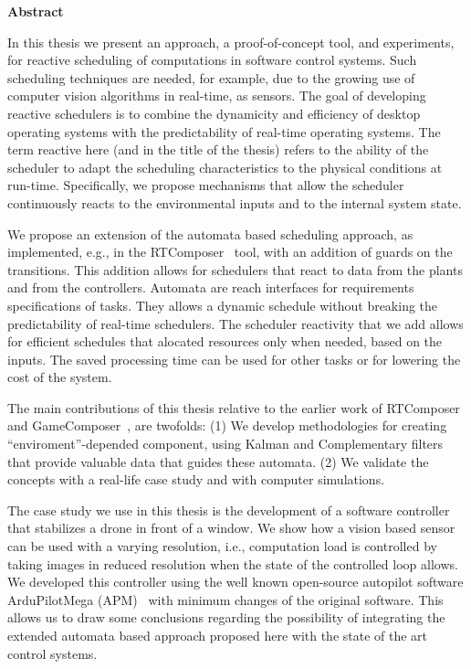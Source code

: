 \documentclass[../hodai_thesis.tex]{subfiles}
\begin{document}
\begin{center}
\LARGE \textbf{Abstract}
\end{center}

In this thesis we present an approach, a proof-of-concept tool, and experiments, for reactive scheduling of computations in software control systems. 
Such scheduling techniques are needed, for example, due to the growing use of computer vision algorithms in real-time, as sensors.
The goal of developing reactive schedulers is to combine the dynamicity and efficiency of desktop operating systems with the predictability of real-time operating systems.
The term reactive here (and in the title of the thesis) refers to the ability of the scheduler to adapt the scheduling characteristics to the physical conditions at run-time. 
Specifically, we propose mechanisms that allow the scheduler continuously reacts to the environmental inputs and to the internal system state. 

We propose an extension of the automata based scheduling approach, as implemented, e.g., in the RTComposer~\cite{RTComposer} tool, with an addition of guards on the
transitions. This addition allows for schedulers that react to data from the plants and from the controllers. Automata are reach interfaces for requirements specifications of tasks. They
allows a dynamic schedule without breaking the predictability of real-time schedulers. The scheduler reactivity that we add allows for efficient schedules that 
alocated resources only when needed, based on the inputs. The saved processing time can be used for other tasks or for lowering the cost of the system.

The main contributions of this thesis relative to the earlier work of RTComposer~\cite{RTComposer} and GameComposer~\cite{Merav}, are twofolds: (1) We develop methodologies for
creating ``enviroment''-depended component, using Kalman and Complementary filters that provide valuable data that guides these automata. (2) We validate the concepts with a real-life 
case study and with computer simulations.

The case study we use in this thesis is the development of a software controller that stabilizes a drone in front of a window. We show how a vision based sensor can be used with a varying resolution, i.e.,
computation load is controlled by taking images in reduced resolution when the state of the controlled loop allows. We developed this controller using the well known 
open-source autopilot software ArduPilotMega (APM)~\cite{APM} with minimum changes of the original software. This allows us to draw some conclusions regarding the possibility of integrating the extended 
automata based approach proposed here with the state of the art control systems.
\end{document}
